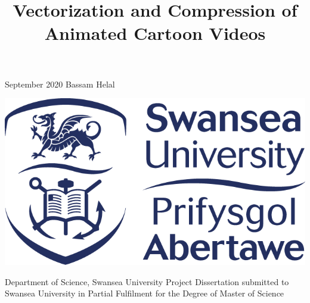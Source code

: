 \documentclass[12pt]{article}
\title{Vectorization and Compression of Animated Cartoon Videos}
\author{}
\date{}
\begin{document}

    \maketitle

    \begin{center}
        \vspace{5cm}
        \large
        September 2020
        \linebreak
        \linebreak
        Bassam Helal
    \end{center}
    \begin{center}
        \vspace{2cm}
        \includegraphics[scale=0.65]{SwanseaUniversityLogo.png}
    \end{center}
    \begin{center}
        \vspace{1cm}
        \normalsize
        Department of Science, Swansea University
        \linebreak
        \linebreak
        Project Dissertation submitted to Swansea University in Partial Fulfilment for the Degree of Master of Science
    \end{center}

    \pagebreak
\end{document}
